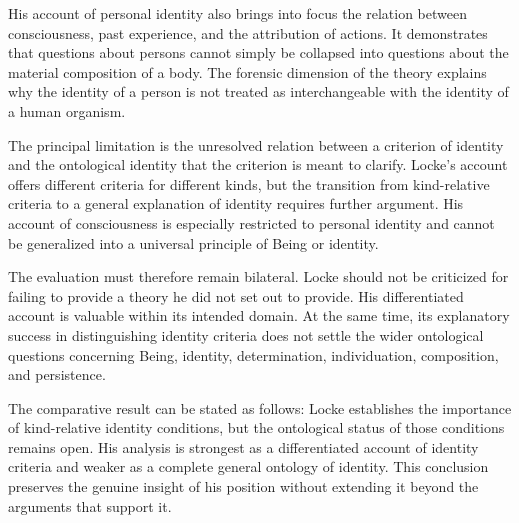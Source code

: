 \label{para:VS.B01.P01.C08.S08.SS14.P002}

His account of personal identity also brings
into focus the relation between consciousness,
past experience, and the attribution of actions.
It demonstrates that questions about persons
cannot simply be collapsed into questions
about the material composition of a body.
The forensic dimension of the theory explains
why the identity of a person is not treated
as interchangeable with the identity of a
human organism.

\label{para:VS.B01.P01.C08.S08.SS14.P003}

The principal limitation is the unresolved
relation between a criterion of identity and
the ontological identity that the criterion
is meant to clarify. Locke's account offers
different criteria for different kinds, but
the transition from kind-relative criteria
to a general explanation of identity requires
further argument. His account of consciousness
is especially restricted to personal identity
and cannot be generalized into a universal
principle of Being or identity.

\label{para:VS.B01.P01.C08.S08.SS14.P004}

The evaluation must therefore remain bilateral.
Locke should not be criticized for failing
to provide a theory he did not set out to
provide. His differentiated account is
valuable within its intended domain. At the
same time, its explanatory success in
distinguishing identity criteria does not
settle the wider ontological questions
concerning Being, identity, determination,
individuation, composition, and persistence.

\label{para:VS.B01.P01.C08.S08.SS14.P005}

The comparative result can be stated as follows:
Locke establishes the importance of kind-relative
identity conditions, but the ontological status
of those conditions remains open. His analysis
is strongest as a differentiated account of
identity criteria and weaker as a complete
general ontology of identity. This conclusion
preserves the genuine insight of his position
without extending it beyond the arguments
that support it.



